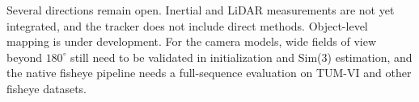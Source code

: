 \documentclass{article}
\begin{document}
Several directions remain open. Inertial and LiDAR measurements are not yet integrated, and the tracker does not include direct methods. Object-level mapping is under development. For the camera models, wide fields of view beyond $180^\circ$ still need to be validated in initialization and Sim(3) estimation, and the native fisheye pipeline needs a full-sequence evaluation on TUM-VI and other fisheye datasets.

%



\end{document}
